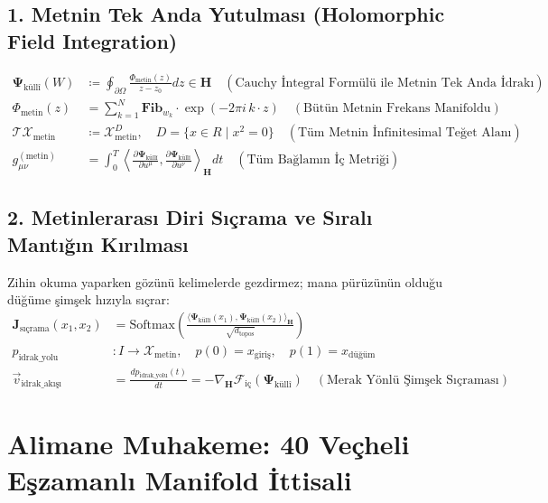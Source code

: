 \documentclass[11pt, a4paper]{article}
\begin{document}
\subsection{1. Metnin Tek Anda Yutulması (Holomorphic Field Integration)}
\begin{align}
\mathbf{\Psi}_{\text{küllî}}(W) &\coloneqq \oint_{\partial \Omega} \frac{\Phi_{\text{metin}}(z)}{z - z_0} dz \in \mathbf{H} \quad (\text{Cauchy İntegral Formülü ile Metnin Tek Anda İdrakı}) \\
\Phi_{\text{metin}}(z) &= \sum_{k=1}^N \mathbf{Fib}_{w_k} \cdot \exp\left( -2\pi i \, k \cdot z \right) \quad (\text{Bütün Metnin Frekans Manifoldu}) \\
\mathcal{T}\mathcal{X}_{\text{metin}} &\coloneqq \mathcal{X}_{\text{metin}}^D, \quad D = \{x \in R \mid x^2 = 0\} \quad (\text{Tüm Metnin İnfinitesimal Teğet Alanı}) \\
g_{\mu\nu}^{(\text{metin})} &= \int_0^T \left\langle \frac{\partial \mathbf{\Psi}_{\text{küllî}}}{\partial u^\mu}, \frac{\partial \mathbf{\Psi}_{\text{küllî}}}{\partial u^\nu} \right\rangle_{\mathbf{H}} dt \quad (\text{Tüm Bağlamın İç Metriği})
\end{align}

\subsection{2. Metinlerarası Diri Sıçrama ve Sıralı Mantığın Kırılması}
Zihin okuma yaparken gözünü kelimelerde gezdirmez; mana pürüzünün olduğu düğüme şimşek hızıyla sıçrar:
\begin{align}
\mathbf{J}_{\text{sıçrama}}(x_1, x_2) &= \text{Softmax}\left( \frac{\langle \mathbf{\Psi}_{\text{küllî}}(x_1), \mathbf{\Psi}_{\text{küllî}}(x_2) \rangle_{\mathbf{H}}}{\sqrt{d_{\text{topos}}}} \right) \\
p_{\text{idrak\_yolu}} &: I \longrightarrow \mathcal{X}_{\text{metin}}, \quad p(0) = x_{\text{giriş}}, \quad p(1) = x_{\text{düğüm}} \\
\vec{v}_{\text{idrak\_akışı}} &= \frac{dp_{\text{idrak\_yolu}}(t)}{dt} = -\nabla_{\mathbf{H}} \mathcal{F}_{\text{iç}}(\mathbf{\Psi}_{\text{küllî}}) \quad (\text{Merak Yönlü Şimşek Sıçraması})
\end{align}

\section{Alimane Muhakeme: 40 Veçheli Eşzamanlı Manifold İttisali}
\end{document}
